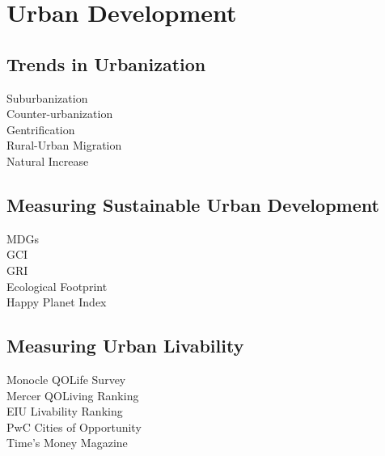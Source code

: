 \documentclass[../../main]{subfiles}
\begin{document}
\section{Urban Development}

\subsection{Trends in Urbanization}

	\begin{description}
		\item[Suburbanization]
		\item[Counter-urbanization]
		\item[Gentrification]
		\item[Rural-Urban Migration]
		\item[Natural Increase]
	\end{description}

\subsection{Measuring Sustainable Urban Development}

	\begin{description}
		\item[MDGs]
		\item[GCI]
		\item[GRI]
		\item[Ecological Footprint]
		\item[Happy Planet Index]
	\end{description}

\subsection{Measuring Urban Livability}

	\begin{description}
		\item[Monocle QOLife Survey]
		\item[Mercer QOLiving Ranking]
		\item[EIU Livability Ranking]
		\item[PwC Cities of Opportunity]
		\item[Time's Money Magazine]
	\end{description}
\end{document}
